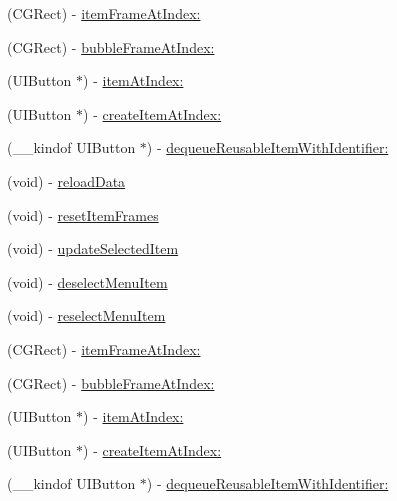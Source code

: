 \begin{DoxyCompactItemize}
\item 
(C\+G\+Rect) -\/ \mbox{\hyperlink{interface_v_t_menu_bar_ab9b968d5635a07a921bea02b7ea019c3}{item\+Frame\+At\+Index\+:}}
\item 
(C\+G\+Rect) -\/ \mbox{\hyperlink{interface_v_t_menu_bar_a917d8914840aa425cd46b272b80854a8}{bubble\+Frame\+At\+Index\+:}}
\item 
(U\+I\+Button $\ast$) -\/ \mbox{\hyperlink{interface_v_t_menu_bar_a99f0f75a9516d06886df6c33e487b6e4}{item\+At\+Index\+:}}
\item 
(U\+I\+Button $\ast$) -\/ \mbox{\hyperlink{interface_v_t_menu_bar_ae78207b0eeb1d9e9597a297db6199403}{create\+Item\+At\+Index\+:}}
\item 
(\+\_\+\+\_\+kindof U\+I\+Button $\ast$) -\/ \mbox{\hyperlink{interface_v_t_menu_bar_a7b6343150eb89027e85a4b7eae6d778d}{dequeue\+Reusable\+Item\+With\+Identifier\+:}}
\item 
(void) -\/ \mbox{\hyperlink{interface_v_t_menu_bar_a40cf86d3f53b0694047557db6d73d3a8}{reload\+Data}}
\item 
(void) -\/ \mbox{\hyperlink{interface_v_t_menu_bar_a877e09cfa864c23b222097c4ca18d377}{reset\+Item\+Frames}}
\item 
(void) -\/ \mbox{\hyperlink{interface_v_t_menu_bar_afde29cf6a8858987b2c839de44455e4c}{update\+Selected\+Item}}
\item 
(void) -\/ \mbox{\hyperlink{interface_v_t_menu_bar_a8539552ebb1885de47bad0ee12416c18}{deselect\+Menu\+Item}}
\item 
(void) -\/ \mbox{\hyperlink{interface_v_t_menu_bar_ae119d889377771b0513ce85bb7582a12}{reselect\+Menu\+Item}}
\item 
(C\+G\+Rect) -\/ \mbox{\hyperlink{interface_v_t_menu_bar_ab9b968d5635a07a921bea02b7ea019c3}{item\+Frame\+At\+Index\+:}}
\item 
(C\+G\+Rect) -\/ \mbox{\hyperlink{interface_v_t_menu_bar_a917d8914840aa425cd46b272b80854a8}{bubble\+Frame\+At\+Index\+:}}
\item 
(U\+I\+Button $\ast$) -\/ \mbox{\hyperlink{interface_v_t_menu_bar_a99f0f75a9516d06886df6c33e487b6e4}{item\+At\+Index\+:}}
\item 
(U\+I\+Button $\ast$) -\/ \mbox{\hyperlink{interface_v_t_menu_bar_ae78207b0eeb1d9e9597a297db6199403}{create\+Item\+At\+Index\+:}}
\item 
(\+\_\+\+\_\+kindof U\+I\+Button $\ast$) -\/ \mbox{\hyperlink{interface_v_t_menu_bar_a7b6343150eb89027e85a4b7eae6d778d}{dequeue\+Reusable\+Item\+With\+Identifier\+:}}
\end{DoxyCompactItemize}
